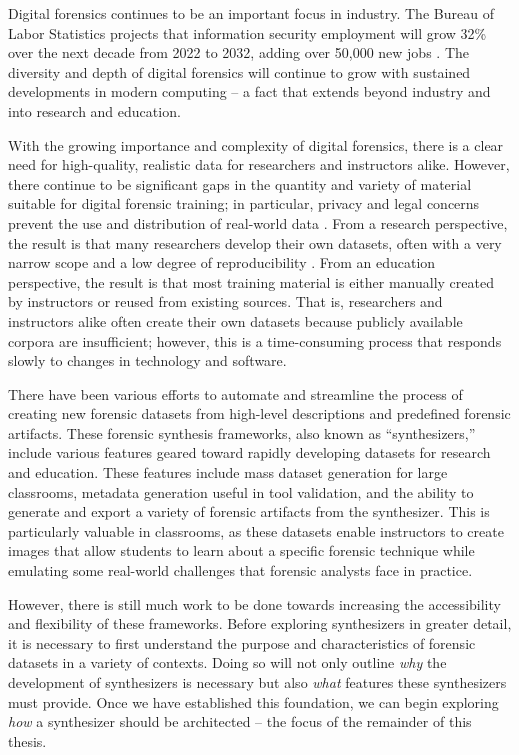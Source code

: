 \documentclass[letterpaper,12pt]{report}
\begin{document}
Digital forensics continues to be an important focus in industry. The
Bureau of Labor Statistics projects that information security employment
will grow 32\% over the next decade from 2022 to 2032, adding over
50,000 new jobs
\cite{bureauoflaborstatisticsu.s.departmentoflaborInformationSecurityAnalysts2023}.
The diversity and depth of digital forensics will continue to grow with
sustained developments in modern computing -- a fact that extends beyond
industry and into research and education.

With the growing importance and complexity of digital forensics, there
is a clear need for high-quality, realistic data for researchers and
instructors alike. However, there continue to be significant gaps in the
quantity and variety of material suitable for digital forensic training;
in particular, privacy and legal concerns prevent the use and
distribution of real-world data
\cite{garfinkelForensicCorporaChallenge2007}. From a research
perspective, the result is that many researchers develop their own
datasets, often with a very narrow scope and a low degree of
reproducibility
\cite{garfinkelBringingScienceDigital2009,grajedaAvailabilityDatasetsDigital2017}.
From an education perspective, the result is that most training material
is either manually created by instructors or reused from existing
sources. That is, researchers and instructors alike often create their
own datasets because publicly available corpora are insufficient;
however, this is a time-consuming process that responds slowly to
changes in technology and software.

There have been various efforts to automate and streamline the process
of creating new forensic datasets from high-level descriptions and
predefined forensic artifacts. These forensic synthesis frameworks, also
known as ``synthesizers,'' include various features geared toward
rapidly developing datasets for research and education. These features
include mass dataset generation for large classrooms, metadata
generation useful in tool validation, and the ability to generate and
export a variety of forensic artifacts from the synthesizer. This is
particularly valuable in classrooms, as these datasets enable
instructors to create images that allow students to learn about a
specific forensic technique while emulating some real-world challenges
that forensic analysts face in practice.

However, there is still much work to be done towards increasing the
accessibility and flexibility of these frameworks. Before exploring
synthesizers in greater detail, it is necessary to first understand the
purpose and characteristics of forensic datasets in a variety of
contexts. Doing so will not only outline \emph{why} the development of
synthesizers is necessary but also \emph{what} features these
synthesizers must provide. Once we have established this foundation, we
can begin exploring \emph{how} a synthesizer should be architected --
the focus of the remainder of this thesis.
\end{document}
